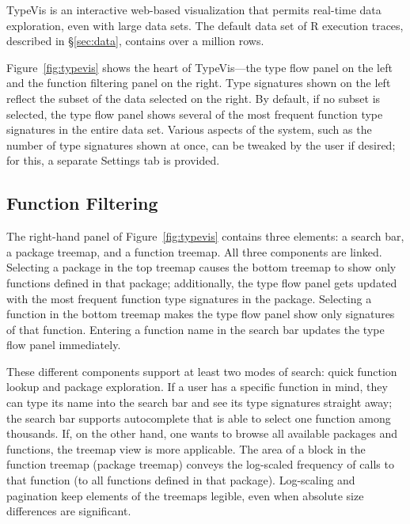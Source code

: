 \documentclass[review]{vgtc}                 %
\newcommand{\typevis}{{\sc TypeVis}\xspace}
\newcommand{\figref}[1]{Figure~\ref{#1}\xspace}
\newcommand{\settingsTab}{{\sc Settings}\xspace}
\begin{document}
\typevis is an interactive web-based visualization
that permits real-time data exploration,
even with large data sets.
The default data set of R execution traces,
described in \S\ref{sec:data},
contains over a million rows.

\figref{fig:typevis} shows
the heart of \typevis---the type flow panel on the left
and the function filtering panel on the right.
Type signatures shown on the left reflect
the subset of the data selected on the right.
By default, if no subset is selected, the type flow
panel shows several of the most frequent function type signatures
in the entire data set.
Various aspects of the system,
such as the number of type signatures shown at once,
can be tweaked by the user if desired;
for this, a separate \settingsTab tab is provided.

\subsection{Function Filtering}

The right-hand panel of \figref{fig:typevis}
contains three elements: a search bar,
a package treemap,
and a function treemap.
All three components are linked.
Selecting a package
in the top treemap causes the bottom treemap
to show only functions defined in that package;
additionally, the type flow panel gets updated
with the most frequent function type signatures in the package.
Selecting a function in the bottom treemap
makes the type flow panel show only signatures
of that function.
Entering a function name in the search bar
updates the type flow panel immediately.

These different components support at least two modes
of search: quick function lookup and package exploration.
If a user has a specific function in mind,
they can type its name into the search bar and see its
type signatures straight away;
the search bar supports autocomplete that is
able to select one function among thousands.
If, on the other hand, one wants to browse
all available packages and functions,
the treemap view is more applicable.
The area of a block in the function treemap (package treemap)
conveys the log-scaled
frequency of calls to that function
(to all functions defined in that package).
Log-scaling and pagination keep
elements of the treemaps legible,
even when absolute size differences are significant.
\end{document}
